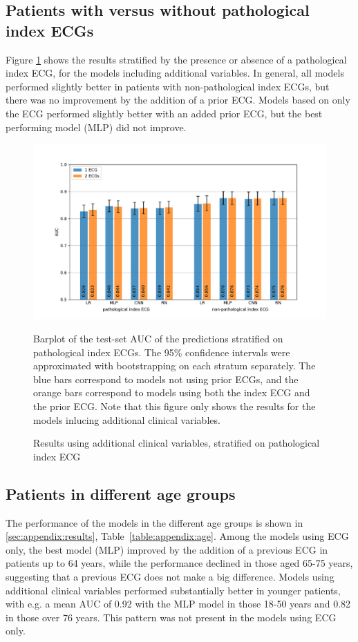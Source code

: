 \documentclass[preprint]{elsarticle}
\begin{document}
\subsection{Patients with versus without pathological index ECGs}
Figure \ref{fig:pathresults} shows the results stratified by the presence or absence of a pathological index ECG, for the models including additional variables. In general, all models performed slightly better in patients with non-pathological index ECGs, but there was no improvement by the addition of a prior ECG. Models based on only the ECG performed slightly better with an added prior ECG, but the best performing model (MLP) did not improve. 

\begin{figure}[h!]
\includegraphics[width=\linewidth]{figures/path_results.pdf}
\caption{Results using additional clinical variables, stratified on pathological index ECG}
\medskip
\small
Barplot of the test-set AUC of the predictions stratified on pathological index ECGs. The 95\% confidence intervals were approximated with bootstrapping on each stratum separately. The blue bars correspond to models not using prior ECGs, and the orange bars correspond to models using both the index ECG and the prior ECG. Note that this figure only shows the results for the models inlucing additional clinical variables.
\label{fig:pathresults}
\end{figure}

\subsection{Patients in different age groups}
The performance of the models in the different age groups is shown in \ref{sec:appendix:results}, Table~\ref{table:appendix:age}. Among the models using ECG only, the best model (MLP) improved by the addition of a previous ECG in patients up to 64 years, while the performance declined in those aged 65-75 years, suggesting that a previous ECG does not make a big difference. Models using additional clinical variables performed substantially better in younger patients, with e.g. a mean AUC of 0.92 with the MLP model in those 18-50 years and 0.82 in those over 76 years. This pattern was not present in the models using ECG only.
\end{document}
